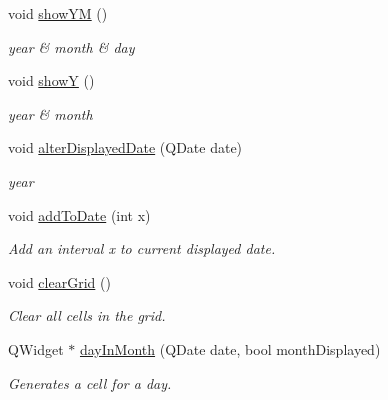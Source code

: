 \begin{DoxyCompactItemize}
void \hyperlink{classMainWindow_a6c1803c0b3b3299044eb2d33bc9c0e7d}{show\+YM} ()
\begin{DoxyCompactList}\small\item\em year \& month \& day \end{DoxyCompactList}\item 
void \hyperlink{classMainWindow_ad779c7052af374e51a7f3a2259874df1}{showY} ()
\begin{DoxyCompactList}\small\item\em year \& month \end{DoxyCompactList}\item 
void \hyperlink{classMainWindow_adfb23ac3d671ce0d029139658d9bf7d3}{alter\+Displayed\+Date} (Q\+Date date)
\begin{DoxyCompactList}\small\item\em year \end{DoxyCompactList}\item 
void \hyperlink{classMainWindow_af7232133bb63540bf0c30b419c36b7d0}{add\+To\+Date} (int x)
\begin{DoxyCompactList}\small\item\em Add an interval x to current displayed date. \end{DoxyCompactList}\item 
void \hyperlink{classMainWindow_a5e43be8d8c2c6a2c5a4a73d764cac47b}{clear\+Grid} ()
\begin{DoxyCompactList}\small\item\em Clear all cells in the grid. \end{DoxyCompactList}\item 
Q\+Widget $\ast$ \hyperlink{classMainWindow_a99a20813bb08b5c93c33f20255f73c67}{day\+In\+Month} (Q\+Date date, bool month\+Displayed)
\begin{DoxyCompactList}\small\item\em Generates a cell for a day. \end{DoxyCompactList}\end{DoxyCompactItemize}
